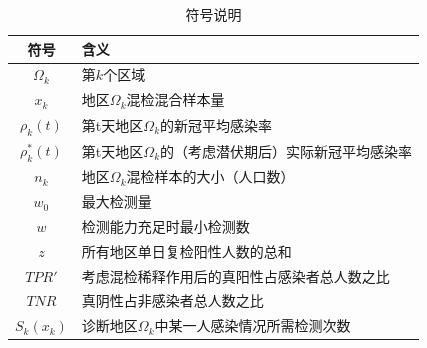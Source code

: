 \documentclass[withoutpreface,bwprint]{cumcmthesis} %
\begin{document}
\begin{table}[H] %
    \begin{center} %
    \caption{符号说明} %
    \begin{tabular}{cl} %
        \toprule %
        \multicolumn{1}{m{3cm}}{\centering 符号} %
        & \multicolumn{1}{m{10cm}}{ 含义} %
        \\ %
        \midrule %
        $\Omega_k$	&第$k$个区域\\
        $x_k$  &地区$\Omega_k$混检混合样本量\\
        $\rho_k(t)$	&第t天地区$\Omega_k$的新冠平均感染率\\
        $\rho^*_k(t)$ &第t天地区$\Omega_k$的（考虑潜伏期后）实际新冠平均感染率 \\
        $n_k$       &地区$\Omega_k$混检样本的大小（人口数）\\
        $w_0$       &最大检测量\\
        $w$	        &检测能力充足时最小检测数\\
        $z$         &所有地区单日复检阳性人数的总和\\
        $TPR'$      &考虑混检稀释作用后的真阳性占感染者总人数之比 \\
        $TNR$       &真阴性占非感染者总人数之比 \\
        $S_k(x_k)$    &诊断地区$\Omega_k$中某一人感染情况所需检测次数 \\
         \bottomrule
        \end{tabular} \label{tb:符号说明}%
    \end{center} %
\end{table} %
\end{document}
